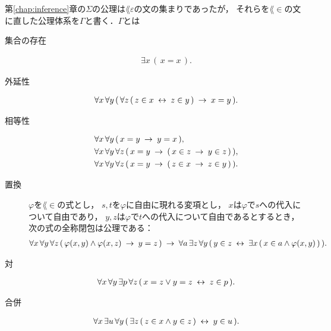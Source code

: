 	第\ref{chap:inference}章の$\Sigma$の公理は$\lang{\varepsilon}$の文の集まりであったが，
	それらを$\lang{\in}$の文に直した公理体系を$\Gamma$と書く．$\Gamma$とは
	\begin{description}
		\item[集合の存在]
			\begin{align}
				\exists x\, (\, x = x\, ).
			\end{align}
		
		\item[外延性]
			\begin{align}
				\forall x\, \forall y\, (\, \forall z\, 
				(\, z \in x \hspace{0.25em}\leftrightarrow\hspace{0.25em} z \in y\, ) \hspace{0.25em}\rightarrow\hspace{0.25em} x = y\, ).
			\end{align}
			
		\item[相等性] 
			\begin{align}
				&\forall x\, \forall y\, (\, x = y \hspace{0.25em}\rightarrow\hspace{0.25em} y = x\, ), \\
				&\forall x\, \forall y\, \forall z\, 
				(\, x = y \hspace{0.25em}\rightarrow\hspace{0.25em} (\, x \in z \hspace{0.25em}\rightarrow\hspace{0.25em} y \in z\, )\, ), \\
				&\forall x\, \forall y\, \forall z\, 
				(\, x = y \hspace{0.25em}\rightarrow\hspace{0.25em} (\, z \in x \hspace{0.25em}\rightarrow\hspace{0.25em} z \in y\, )\, ).
			\end{align}
		
		\item[置換] $\varphi$を$\lang{\in}$の式とし，
			$s,t$を$\varphi$に自由に現れる変項とし，
			$x$は$\varphi$で$s$への代入について自由であり，
			$y,z$は$\varphi$で$t$への代入について自由であるとするとき，
			次の式の全称閉包\footnotemark は公理である：
			\begin{align}
				\forall x\, \forall y\, \forall z\, 
				(\, \varphi(x,y) \wedge \varphi(x,z)
				\hspace{0.25em}\rightarrow\hspace{0.25em} y = z\, )
				\hspace{0.25em}\rightarrow\hspace{0.25em} \forall a\, \exists z\, \forall y\,
				(\, y \in z \hspace{0.25em}\leftrightarrow\hspace{0.25em} \exists x\, (\, x \in a \wedge 
				\varphi(x,y)\, )\, ).
			\end{align}
			
		\item[対] 
			\begin{align}
				\forall x\, \forall y\, \exists p\, \forall z\, 
				(\, x = z \vee y = z \hspace{0.25em}\leftrightarrow\hspace{0.25em} z \in p\, ).
			\end{align}
			
		\item[合併] 
			\begin{align}
				\forall x\, \exists u\, \forall y\, (\, \exists z\, (\, z \in x \wedge y \in z\, ) \hspace{0.25em}\leftrightarrow\hspace{0.25em} y \in u\, ).
			\end{align}
			

\end{description}
